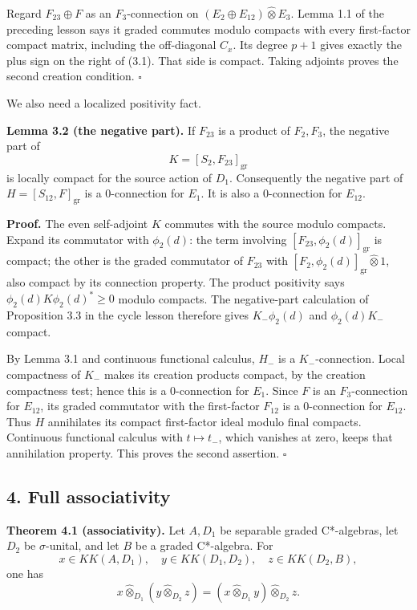 \documentclass[
  11pt,
]{article}
\begin{document}
Regard \(F_{23}\oplus F\) as an \(F_3\)-connection on
\((E_2\oplus E_{12})\widehat\otimes E_3\). Lemma 1.1 of the preceding
lesson says it graded commutes modulo compacts with every first-factor
compact matrix, including the off-diagonal \(C_x\). Its degree \(p+1\)
gives exactly the plus sign on the right of (3.1). That side is compact.
Taking adjoints proves the second creation condition. \(\square\)

We also need a localized positivity fact.

\textbf{Lemma 3.2 (the negative part).} If \(F_{23}\) is a product of
\(F_2,F_3\), the negative part of \[
K=[S_2,F_{23}]_{\mathrm{gr}}
\] is locally compact for the source action of \(D_1\). Consequently the
negative part of \(H=[S_{12},F]_{\mathrm{gr}}\) is a \(0\)-connection
for \(E_1\). It is also a \(0\)-connection for \(E_{12}\).

\textbf{Proof.} The even self-adjoint \(K\) commutes with the source
modulo compacts. Expand its commutator with \(\phi_2(d)\): the term
involving \([F_{23},\phi_2(d)]_{\mathrm{gr}}\) is compact; the other is
the graded commutator of \(F_{23}\) with
\([F_2,\phi_2(d)]_{\mathrm{gr}}\widehat\otimes1\), also compact by its
connection property. The product positivity says
\(\phi_2(d)K\phi_2(d)^*\geq0\) modulo compacts. The negative-part
calculation of Proposition 3.3 in the cycle lesson therefore gives
\(K_-\phi_2(d)\) and \(\phi_2(d)K_-\) compact.

By Lemma 3.1 and continuous functional calculus, \(H_-\) is a
\(K_-\)-connection. Local compactness of \(K_-\) makes its creation
products compact, by the creation compactness test; hence this is a
\(0\)-connection for \(E_1\). Since \(F\) is an \(F_3\)-connection for
\(E_{12}\), its graded commutator with the first-factor \(F_{12}\) is a
\(0\)-connection for \(E_{12}\). Thus \(H\) annihilates its compact
first-factor ideal modulo final compacts. Continuous functional calculus
with \(t\mapsto t_-\), which vanishes at zero, keeps that annihilation
property. This proves the second assertion. \(\square\)

\subsection{4. Full associativity}\label{full-associativity}

\textbf{Theorem 4.1 (associativity).} Let \(A,D_1\) be separable graded
C*-algebras, let \(D_2\) be \(\sigma\)-unital, and let \(B\) be a graded
C*-algebra. For \[
x\in KK(A,D_1),\quad y\in KK(D_1,D_2),\quad
z\in KK(D_2,B),
\] one has \[
x\widehat\otimes_{D_1}(y\widehat\otimes_{D_2}z)
=(x\widehat\otimes_{D_1}y)\widehat\otimes_{D_2}z.
\tag{4.1}
\]
\end{document}
